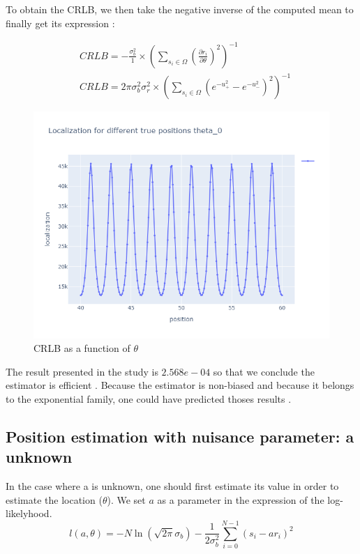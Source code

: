 \documentclass[10pt,letterpaper]{article}
\begin{document}
To obtain the CRLB, we then take the negative inverse of the computed mean to finally get its expression :

\begin{align}
& C R L B=-\frac{\sigma_b^2}{1} \times\left(\sum_{s_i \in \Omega} \left(\frac{\partial r_i}{\partial \theta}\right)^2\right)^{-1} \\
& C R L B=2\pi\sigma_b^2\sigma_r^2 \times\left(\sum_{s_i \in \Omega}\left(e^{-u_+^2}-e^{-u_{-}^2}\right)^2\right)^{-1}
\end{align}

\begin{figure}[h]
	\centering
	\includegraphics[scale=0.45]{CRLB_evol.png}
	\caption{CRLB as a function of $\theta$}
	\label{fig:CRLB-evol}
\end{figure}

The result presented in the study is $2.568e-04$ so that we conclude the estimator is efficient \cite{project}. Because the estimator is non-biased and because it belongs to the exponential family, one could have predicted thoses results \cite{goudail}.

\subsection{Position estimation with nuisance parameter: a unknown}
In the case where a is unknown, one should first estimate its value in order to estimate the location ($\theta$). We set $a$ as a parameter in the expression of the log-likelyhood.
\begin{equation}
l(a, \theta)=-N \ln \left(\sqrt{2 \pi} \sigma_b\right)-\frac{1}{2 \sigma_b^2} \sum_{i=0}^{N-1}\left(s_i-a r_i\right)^2
\end{equation}
\end{document}
